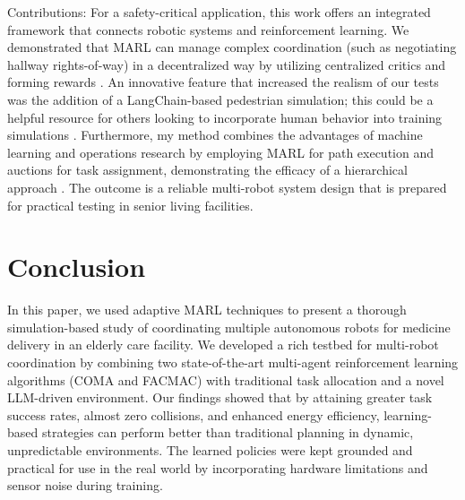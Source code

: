 \documentclass[conference]{IEEEtran}
\begin{document}
Contributions: For a safety-critical application, this work offers an integrated framework that connects robotic systems and reinforcement learning. We demonstrated that MARL can manage complex coordination (such as negotiating hallway rights-of-way) in a decentralized way by utilizing centralized critics and forming rewards \citep{wang2023a}. An innovative feature that increased the realism of our tests was the addition of a LangChain-based pedestrian simulation; this could be a helpful resource for others looking to incorporate human behavior into training simulations \citep{yang2022, rostumi2019}. Furthermore, my method combines the advantages of machine learning and operations research by employing MARL for path execution and auctions for task assignment, demonstrating the efficacy of a hierarchical approach \citep{kayy2017, gerkey2023}. The outcome is a reliable multi-robot system design that is prepared for practical testing in senior living facilities.

\section{Conclusion}
\label{sec:conclusion}
In this paper, we used adaptive MARL techniques to present a thorough simulation-based study of coordinating multiple autonomous robots for medicine delivery in an elderly care facility. We developed a rich testbed for multi-robot coordination by combining two state-of-the-art multi-agent reinforcement learning algorithms (COMA and FACMAC) with traditional task allocation and a novel LLM-driven environment. Our findings showed that by attaining greater task success rates, almost zero collisions, and enhanced energy efficiency, learning-based strategies can perform better than traditional planning in dynamic, unpredictable environments. The learned policies were kept grounded and practical for use in the real world by incorporating hardware limitations and sensor noise during training.
\end{document}
